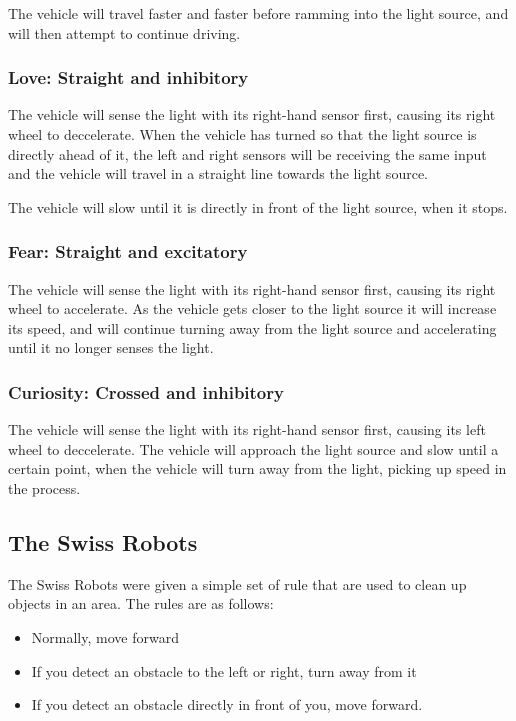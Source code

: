 The vehicle will travel faster and faster before ramming into
the light source, and will then attempt to continue driving.

\subsubsection{Love: Straight and inhibitory}
The vehicle will sense the light with its right-hand sensor first, causing its
right wheel to deccelerate. When the vehicle has turned so that the light
source is directly ahead of it, the left and right sensors will be receiving
the same input and the vehicle will travel in a straight line towards the light
source.

The vehicle will slow until it is directly in front of the light source, when
it stops.

\subsubsection{Fear: Straight and excitatory}
The vehicle will sense the light with its right-hand sensor first, causing its
right wheel to accelerate. As the vehicle gets closer to the light source it
will increase its speed, and will continue turning away from the light source
and accelerating until it no longer senses the light.

\subsubsection{Curiosity: Crossed and inhibitory}
The vehicle will sense the light with its right-hand sensor first, causing its
left wheel to deccelerate. The vehicle will approach the light source and slow
until a certain point, when the vehicle will turn away from the light, picking
up speed in the process.

\subsection{The Swiss Robots}
The Swiss Robots were given a simple set of rule that are used to clean up
objects in an area. The rules are as follows:
\begin{itemize}
    \item Normally, move forward
    \item If you detect an obstacle to the left or right, turn away from it
    \item If you detect an obstacle directly in front of you, move forward.
\end{itemize}

